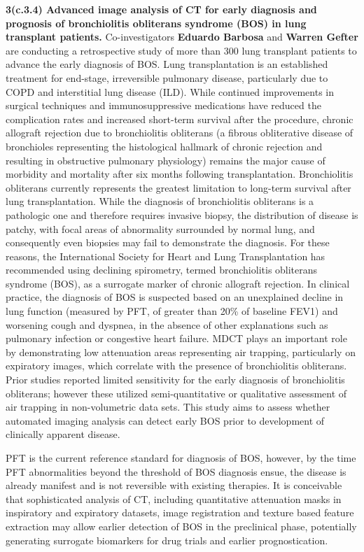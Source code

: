 \documentclass[11pt,]{article}
\begin{document}
\textbf{3(c.3.4) Advanced image analysis of CT for early diagnosis and
prognosis of bronchiolitis obliterans syndrome (BOS) in lung transplant
patients.} Co-investigators \textbf{Eduardo Barbosa} and \textbf{Warren
Gefter} are conducting a retrospective study of more than 300 lung
transplant patients to advance the early diagnosis of BOS. Lung
transplantation is an established treatment for end-stage, irreversible
pulmonary disease, particularly due to COPD and interstitial lung
disease (ILD). While continued improvements in surgical techniques and
immunosuppressive medications have reduced the complication rates and
increased short-term survival after the procedure, chronic allograft
rejection due to bronchiolitis obliterans (a fibrous obliterative
disease of bronchioles representing the histological hallmark of chronic
rejection and resulting in obstructive pulmonary physiology) remains the
major cause of morbidity and mortality after six months following
transplantation. Bronchiolitis obliterans currently represents the
greatest limitation to long-term survival after lung transplantation.
While the diagnosis of bronchiolitis obliterans is a pathologic one and
therefore requires invasive biopsy, the distribution of disease is
patchy, with focal areas of abnormality surrounded by normal lung, and
consequently even biopsies may fail to demonstrate the diagnosis. For
these reasons, the International Society for Heart and Lung
Transplantation has recommended using declining spirometry, termed
bronchiolitis obliterans syndrome (BOS), as a surrogate marker of
chronic allograft rejection. In clinical practice, the diagnosis of BOS
is suspected based on an unexplained decline in lung function (measured
by PFT, of greater than 20\% of baseline FEV1) and worsening cough and
dyspnea, in the absence of other explanations such as pulmonary
infection or congestive heart failure. MDCT plays an important role by
demonstrating low attenuation areas representing air trapping,
particularly on expiratory images, which correlate with the presence of
bronchiolitis obliterans. Prior studies reported limited sensitivity for
the early diagnosis of bronchiolitis obliterans; however these utilized
semi-quantitative or qualitative assessment of air trapping in
non-volumetric data sets. This study aims to assess whether automated
imaging analysis can detect early BOS prior to development of clinically
apparent disease.

PFT is the current reference standard for diagnosis of BOS, however, by
the time PFT abnormalities beyond the threshold of BOS diagnosis ensue,
the disease is already manifest and is not reversible with existing
therapies. It is conceivable that sophisticated analysis of CT,
including quantitative attenuation masks in inspiratory and expiratory
datasets, image registration and texture based feature extraction may
allow earlier detection of BOS in the preclinical phase, potentially
generating surrogate biomarkers for drug trials and earlier
prognostication.
\end{document}

